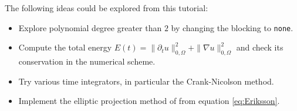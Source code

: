 \documentclass[a4paper,12pt]{article}
\begin{document}
The following ideas could be explored from this tutorial:
\begin{itemize}
\item Explore polynomial degree greater than $2$ by changing the blocking
to \lstinline{none}.
\item Compute the total energy $E(t) = \|\partial_t u\|_{0,\Omega}^2 +
  \|\nabla u\|_{0,\Omega}^2$ and check its conservation in
the numerical scheme.
\item Try various time integrators, in particular the Crank-Nicolson method.
\item Implement the elliptic projection method of \cite{Eriksson} from
equation \eqref{eq:Eriksson}.
\end{itemize}



\end{document}
